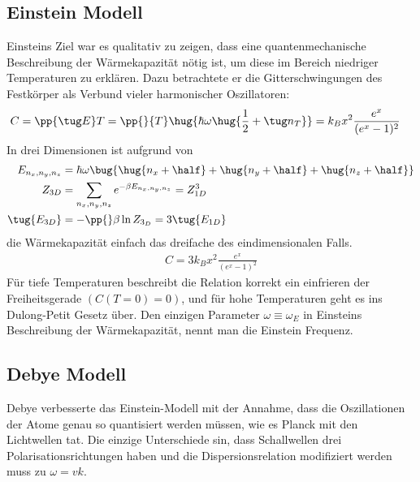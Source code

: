 \documentclass[bfvec]{summery_5.0}
\begin{document}
\subsection{Einstein Modell}
Einsteins Ziel war es qualitativ zu zeigen, dass eine quantenmechanische Beschreibung der Wärmekapazität nötig ist, um diese im Bereich niedriger Temperaturen zu erklären. Dazu betrachtete er die Gitterschwingungen des Festkörper als Verbund vieler harmonischer Oszillatoren: 
\begin{align*}
    C &= \pp{\tug E}T 
    = \pp{}{T} \hug{\hbar\omega \hug{\frac12+ \tug n_T}} 
    = k_B x^2 \frac{e^x}{(e^x-1)^2}
\end{align*}
In drei Dimensionen ist aufgrund von 
\begin{align*}
    E_{n_x,n_y,n_z} &= \hbar\omega \bug{\hug{n_x+\half} + \hug{n_y+\half} +\hug{n_z+\half}}\\
    Z_{3D} &= \sum_{n_x,n_y,n_z} e^{-\beta E_{n_x,n_y,n_z}}= Z_{1D}^3\\
    \tug{E_{3D}} &= -\pp{}\beta \ln Z_{3_D} = 3 \tug{E_{1D}}
\end{align*} 
die Wärmekapazität einfach das dreifache des eindimensionalen Falls.
\begin{align*}
    \boxed{C = 3k_B x^2 \frac{e^x}{(e^x-1)^2}}
\end{align*}
Für tiefe Temperaturen beschreibt die Relation korrekt ein einfrieren 
der Freiheitsgerade $(C(T=0)=0)$, und für hohe Temperaturen geht es ins Dulong-Petit Gesetz über.
Den einzigen Parameter \(\omega\equiv \omega_E\) in Einsteins Beschreibung der Wärmekapazität, nennt man die Einstein Frequenz.

\subsection{Debye Modell}
Debye verbesserte das Einstein-Modell mit der Annahme, dass die Oszillationen der Atome genau so quantisiert werden müssen, wie es Planck mit den Lichtwellen tat. 
Die einzige Unterschiede sin, dass Schallwellen drei Polarisationsrichtungen haben und die Dispersionsrelation modifiziert werden muss zu $\omega = vk$.\\
\end{document}
